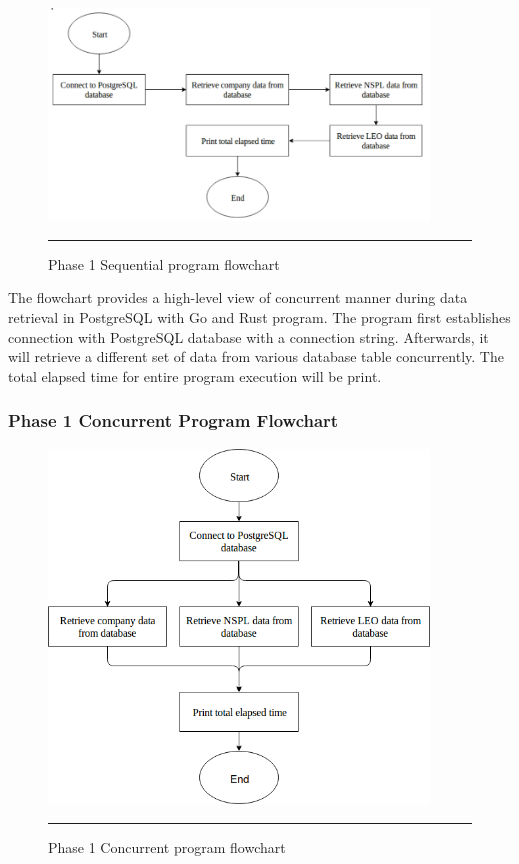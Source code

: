 \begin{figure}[H]
	\centering
	\includegraphics[width=0.9\textwidth]{Figure/postgres-data-sequential.png}
	\rule{35em}{0.5pt}
	\caption[Phase 1 Sequential program flowchart]{Phase 1 Sequential program flowchart}
\end{figure}

The flowchart provides a high-level view of concurrent manner during data retrieval in PostgreSQL with Go and Rust program. The program first establishes connection with PostgreSQL database with a connection string. Afterwards, it will retrieve a different set of data from various database table concurrently. The total elapsed time for entire program execution will be print.

\subsubsection{Phase 1 Concurrent Program Flowchart}

\begin{figure}[H]
	\centering
	\includegraphics[width=0.9\textwidth]{Figure/postgres-data-concurrent.png}
	\rule{35em}{0.5pt}
	\caption[Phase 1 Concurrent program flowchart]{Phase 1 Concurrent program flowchart}
\end{figure}


